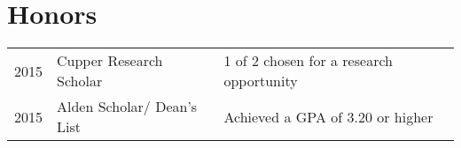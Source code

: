 \documentclass[]{brandon_ginoza_resume}
\begin{document}
\begin{minipage}[t]{0.66\textwidth}


\section{Honors} 
\begin{tabular}{rll}
2015	     & Cupper Research Scholar & 1 of 2 chosen for a research opportunity\\
2015		 & Alden Scholar/ Dean's List & Achieved a GPA of 3.20 or higher\\
\end{tabular}
\sectionsep




\end{minipage} 
\end{document}
